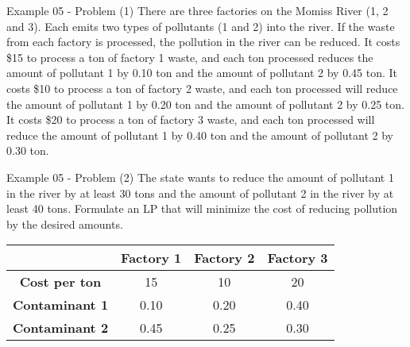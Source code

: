 \begin{frame}{Example 05 - Problem (1)}
There are three factories on the Momiss River (1, 2 and 3). Each emits two types
of pollutants (1 and 2) into the river. If the waste from each factory is 
processed, the pollution in the river can be reduced. It costs \$15 to process a
ton of factory 1 waste, and each ton processed reduces the amount of pollutant 1
by 0.10 ton and the amount of pollutant 2 by 0.45 ton. It costs \$10 to process
a ton of factory 2 waste, and each ton processed will reduce the amount of 
pollutant 1 by 0.20 ton and the amount of pollutant 2 by 0.25 ton. It costs \$20
to process a ton of factory 3 waste, and each ton processed will reduce the 
amount of pollutant 1 by 0.40 ton and the amount of pollutant 2 by 0.30 ton.
\end{frame}

\begin{frame}{Example 05 - Problem (2)}
The state wants to reduce the amount of pollutant 1 in the river by at least 30 
tons and the amount of pollutant 2 in the river by at least 40 tons. Formulate 
an LP that will minimize the cost of reducing pollution by the desired amounts.

\begin{center}
\begin{tabular}{|c||c|c|c|}
\hline
& \cellcolor{gray90}\textbf{Factory 1} 
& \cellcolor{gray90}\textbf{Factory 2} 
& \cellcolor{gray90}\textbf{Factory 3} \\
\hline
\hline \cellcolor{gray90}\textbf{Cost per ton}  & 15   & 10   & 20   \\
\hline \cellcolor{gray90}\textbf{Contaminant 1} & 0.10 & 0.20 & 0.40 \\
\hline \cellcolor{gray90}\textbf{Contaminant 2} & 0.45 & 0.25 & 0.30 \\
\hline 
\end{tabular}
\end{center}

\end{frame}
